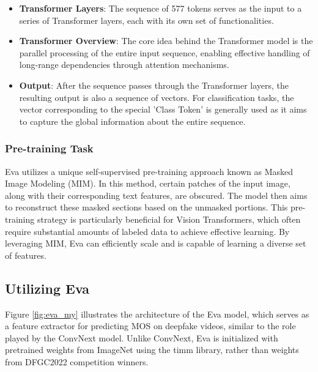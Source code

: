 \documentclass[a4paper,12pt,openright]{book}
\begin{document}
\begin{itemize}
    

    \item \textbf{Transformer Layers}: The sequence of 577 tokens serves as the input to a series of Transformer layers, each with its own set of functionalities.
    

    \item \textbf{Transformer Overview}: 
    The core idea behind the Transformer model is the parallel processing of the entire input sequence, enabling effective handling of long-range dependencies through attention mechanisms.
    
    \item \textbf{Output}: 
    After the sequence passes through the Transformer layers, the resulting output is also a sequence of vectors. For classification tasks, the vector corresponding to the special 'Class Token' is generally used as it aims to capture the global information about the entire sequence.
\end{itemize}



\subsubsection{Pre-training Task}
\label{subsubsec:eva_pretraining}

Eva utilizes a unique self-supervised pre-training approach known as Masked Image Modeling (MIM). In this method, certain patches of the input image, along with their corresponding text features, are obscured. The model then aims to reconstruct these masked sections based on the unmasked portions. This pre-training strategy is particularly beneficial for Vision Transformers, which often require substantial amounts of labeled data to achieve effective learning. By leveraging MIM, Eva can efficiently scale and is capable of learning a diverse set of features. 

\newpage

\subsection{Utilizing Eva}

Figure \ref{fig:eva_my} illustrates the architecture of the Eva model, which serves as a feature extractor for predicting MOS on deepfake videos, similar to the role played by the ConvNext model. Unlike ConvNext, Eva is initialized with pretrained weights from ImageNet using the timm library, rather than weights from DFGC2022 competition winners.
\end{document}
